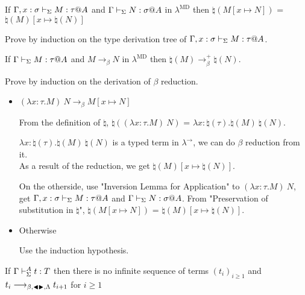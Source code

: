 \begin{lemma}
	If $\G, x:\sigma \V M:\tau@A$ and $\G \V N:\sigma@A$ in $\lambda^{\text{MD}}$
	then $\natural(M[x \mapsto N])$ = $\natural(M)[x\mapsto\natural(N)]$
\end{lemma}
	
Prove by induction on the type derivation tree of $\G, x:\sigma \V M:\tau@A$.
	
\begin{lemma}
	If $\G \V M:\tau@A$ and $M \longrightarrow_\beta N$ in $\lambda^{\text{MD}}$
	then $\natural(M) \longrightarrow_\beta^+ \natural(N)$.
\end{lemma}
	
Prove by induction on the derivation of $\beta$ reduction.
	
\begin{itemize}
	\newcommand{\R}{\longrightarrow_{\beta}}
	\item $(\lambda x:\tau.M)\ N \R M[x \mapsto N]$
	      	      	      	      	      	      		      	      	      	      
	      From the definition of $\natural$, $\natural((\lambda x:\tau.M)\ N)$ = $\lambda x:\natural(\tau).\natural(M)\ \natural(N)$.
	      	      	      	      	      	      		      	      	      	      
	      $\lambda x:\natural(\tau).\natural(M)\ \natural(N)$ is a typed term in $\lambda^\to$, we can do $\beta$ reduction from it.\\
	      As a result of the reduction, we get $\natural(M)[x\mapsto\natural(N)]$.
	      	      	      	      	      	      		      	      	      	      
	      On the otherside, use "Inversion Lemma for Application" to $(\lambda x:\tau.M)\ N$, get $\G, x:\sigma \V M:\tau@A$ and $\G \V N:\sigma@A$.
	      From "Preservation of substitution in $\natural$", $\natural(M[x \mapsto N])$ = $\natural(M)[x\mapsto\natural(N)]$.
	      	      	      	      	      	      		      	      	      	      
	\item Otherwise
	      	      	      	      	      	      		      	      	      	      
	      Use the induction hypothesis.
\end{itemize}
	
\begin{theorem}
	If $\Gamma\vdash_\Sigma^A t:T$ then there is no infinite sequence of terms $(t_i)_{i\ge1}$ and $t_i \longrightarrow_{\beta, {\mathop{\blacktriangleleft}} {\mathop{\blacktriangleright}},\Lambda} t_{i+1}$ for $i\ge 1$
\end{theorem}
	

